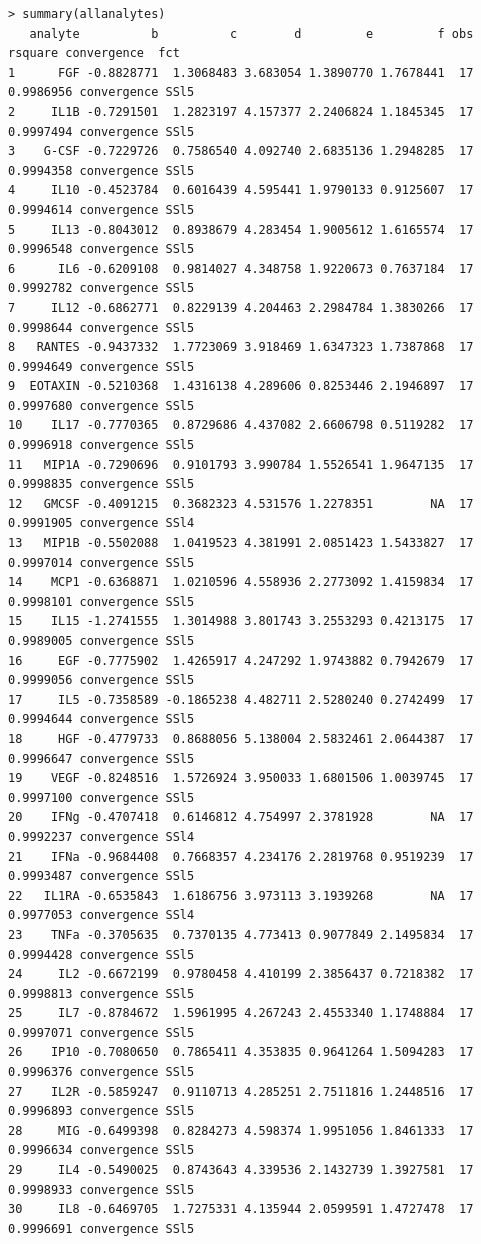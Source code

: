 \documentclass[11pt]{article}\usepackage[]{graphicx}\usepackage[]{color}
\makeatletter
\newenvironment{kframe}{%
 \def\at@end@of@kframe{}%
 \ifinner\ifhmode%
  \def\at@end@of@kframe{\end{minipage}}%
  \begin{minipage}{\columnwidth}%
 \fi\fi%
 \def\FrameCommand##1{\hskip\@totalleftmargin \hskip-\fboxsep
 \colorbox{shadecolor}{##1}\hskip-\fboxsep
     \hskip-\linewidth \hskip-\@totalleftmargin \hskip\columnwidth}%
 \MakeFramed {\advance\hsize-\width
   \@totalleftmargin\z@ \linewidth\hsize
   \@setminipage}}%
 {\par\unskip\endMakeFramed%
 \at@end@of@kframe}
\newenvironment{knitrout}{}{} %
\makeatother
\begin{document}
\begin{knitrout}\small
{}\color{fgcolor}\begin{kframe}
\begin{verbatim}
> summary(allanalytes)
   analyte          b          c        d         e         f obs   rsquare convergence  fct
1      FGF -0.8828771  1.3068483 3.683054 1.3890770 1.7678441  17 0.9986956 convergence SSl5
2     IL1B -0.7291501  1.2823197 4.157377 2.2406824 1.1845345  17 0.9997494 convergence SSl5
3    G-CSF -0.7229726  0.7586540 4.092740 2.6835136 1.2948285  17 0.9994358 convergence SSl5
4     IL10 -0.4523784  0.6016439 4.595441 1.9790133 0.9125607  17 0.9994614 convergence SSl5
5     IL13 -0.8043012  0.8938679 4.283454 1.9005612 1.6165574  17 0.9996548 convergence SSl5
6      IL6 -0.6209108  0.9814027 4.348758 1.9220673 0.7637184  17 0.9992782 convergence SSl5
7     IL12 -0.6862771  0.8229139 4.204463 2.2984784 1.3830266  17 0.9998644 convergence SSl5
8   RANTES -0.9437332  1.7723069 3.918469 1.6347323 1.7387868  17 0.9994649 convergence SSl5
9  EOTAXIN -0.5210368  1.4316138 4.289606 0.8253446 2.1946897  17 0.9997680 convergence SSl5
10    IL17 -0.7770365  0.8729686 4.437082 2.6606798 0.5119282  17 0.9996918 convergence SSl5
11   MIP1A -0.7290696  0.9101793 3.990784 1.5526541 1.9647135  17 0.9998835 convergence SSl5
12   GMCSF -0.4091215  0.3682323 4.531576 1.2278351        NA  17 0.9991905 convergence SSl4
13   MIP1B -0.5502088  1.0419523 4.381991 2.0851423 1.5433827  17 0.9997014 convergence SSl5
14    MCP1 -0.6368871  1.0210596 4.558936 2.2773092 1.4159834  17 0.9998101 convergence SSl5
15    IL15 -1.2741555  1.3014988 3.801743 3.2553293 0.4213175  17 0.9989005 convergence SSl5
16     EGF -0.7775902  1.4265917 4.247292 1.9743882 0.7942679  17 0.9999056 convergence SSl5
17     IL5 -0.7358589 -0.1865238 4.482711 2.5280240 0.2742499  17 0.9994644 convergence SSl5
18     HGF -0.4779733  0.8688056 5.138004 2.5832461 2.0644387  17 0.9996647 convergence SSl5
19    VEGF -0.8248516  1.5726924 3.950033 1.6801506 1.0039745  17 0.9997100 convergence SSl5
20    IFNg -0.4707418  0.6146812 4.754997 2.3781928        NA  17 0.9992237 convergence SSl4
21    IFNa -0.9684408  0.7668357 4.234176 2.2819768 0.9519239  17 0.9993487 convergence SSl5
22   IL1RA -0.6535843  1.6186756 3.973113 3.1939268        NA  17 0.9977053 convergence SSl4
23    TNFa -0.3705635  0.7370135 4.773413 0.9077849 2.1495834  17 0.9994428 convergence SSl5
24     IL2 -0.6672199  0.9780458 4.410199 2.3856437 0.7218382  17 0.9998813 convergence SSl5
25     IL7 -0.8784672  1.5961995 4.267243 2.4553340 1.1748884  17 0.9997071 convergence SSl5
26    IP10 -0.7080650  0.7865411 4.353835 0.9641264 1.5094283  17 0.9996376 convergence SSl5
27    IL2R -0.5859247  0.9110713 4.285251 2.7511816 1.2448516  17 0.9996893 convergence SSl5
28     MIG -0.6499398  0.8284273 4.598374 1.9951056 1.8461333  17 0.9996634 convergence SSl5
29     IL4 -0.5490025  0.8743643 4.339536 2.1432739 1.3927581  17 0.9998933 convergence SSl5
30     IL8 -0.6469705  1.7275331 4.135944 2.0599591 1.4727478  17 0.9996691 convergence SSl5
\end{verbatim}
\end{kframe}
\end{knitrout}
\end{document}
